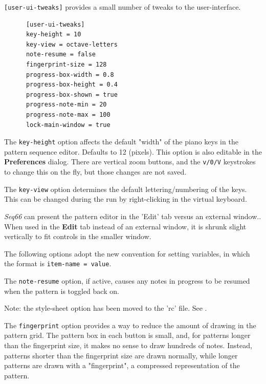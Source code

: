    \texttt{[user-ui-tweaks]} provides a small number of tweaks to the
   user-interface.

   \begin{verbatim}
      [user-ui-tweaks]
      key-height = 10
      key-view = octave-letters
      note-resume = false
      fingerprint-size = 128
      progress-box-width = 0.8
      progress-box-height = 0.4
      progress-box-shown = true
      progress-note-min = 20
      progress-note-max = 100
      lock-main-window = true
   \end{verbatim}


   The \texttt{key-height} option
   affects the default "width" of the piano keys in the pattern
   sequence editor.  Defaults to 12 (pixels).
   This option is also editable in the \textbf{Preferences} dialog.
   There are vertical zoom buttons, and the \texttt{v/0/V} keystrokes to change
   this on the fly, but those changes are not saved.

   The \texttt{key-view} option determines the default lettering/numbering of the
   keys. This can be changed during the run by right-clicking in the virtual
   keyboard.

   \textsl{Seq66} can present the pattern editor in the 'Edit' tab
   versus an external window..
   When used in the \textbf{Edit} tab instead of an external window,
   it is shrunk slight vertically to fit controls in the smaller window.

   The following options adopt the new convention for setting variables, in
   which the format is \texttt{item-name = value}.

   The \texttt{note-resume} option, if active, causes any notes in progress
   to be resumed when the pattern is toggled back on.

   Note: the style-sheet option has been moved to the 'rc' file.
   See .

   The \texttt{fingerprint} option provides a way to reduce the amount of
   drawing in the pattern grid.  The pattern box in each button is small, and,
   for patterns longer than the fingerprint size, it makes no sense to draw
   hundreds of notes.  Instead, patterns shorter than the fingerprint size are
   drawn normally, while longer patterns are drawn with a "fingerprint", a
   compressed representation of the pattern.

